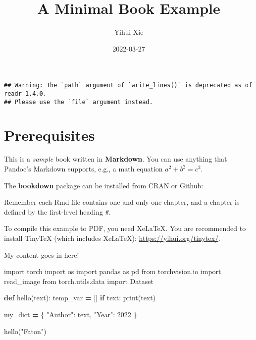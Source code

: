 \documentclass[
]{book}
\title{A Minimal Book Example}
\author{Yihui Xie}
\date{2022-03-27}
\newenvironment{Shaded}{\begin{snugshade}}{\end{snugshade}}
\newcommand{\BuiltInTok}[1]{#1}
\newcommand{\ControlFlowTok}[1]{\textcolor[rgb]{0.13,0.29,0.53}{\textbf{#1}}}
\newcommand{\DecValTok}[1]{\textcolor[rgb]{0.00,0.00,0.81}{#1}}
\newcommand{\ImportTok}[1]{#1}
\newcommand{\KeywordTok}[1]{\textcolor[rgb]{0.13,0.29,0.53}{\textbf{#1}}}
\newcommand{\NormalTok}[1]{#1}
\newcommand{\OperatorTok}[1]{\textcolor[rgb]{0.81,0.36,0.00}{\textbf{#1}}}
\newcommand{\StringTok}[1]{\textcolor[rgb]{0.31,0.60,0.02}{#1}}
\begin{document}
\maketitle

{
\setcounter{tocdepth}{1}
\tableofcontents
}
\begin{verbatim}
## Warning: The `path` argument of `write_lines()` is deprecated as of readr 1.4.0.
## Please use the `file` argument instead.
\end{verbatim}

\hypertarget{prerequisites}{%
\chapter*{Prerequisites}\label{prerequisites}}

This is a \emph{sample} book written in \textbf{Markdown}. You can use anything that Pandoc's Markdown supports, e.g., a math equation \(a^2 + b^2 = c^2\).

The \textbf{bookdown} package can be installed from CRAN or Github:

Remember each Rmd file contains one and only one chapter, and a chapter is defined by the first-level heading \texttt{\#}.

To compile this example to PDF, you need XeLaTeX. You are recommended to install TinyTeX (which includes XeLaTeX): \url{https://yihui.org/tinytex/}.

My content goes in here!

\begin{Shaded}
\begin{Highlighting}[]
\ImportTok{import}\NormalTok{ torch}
\ImportTok{import}\NormalTok{ os}
\ImportTok{import}\NormalTok{ pandas }\ImportTok{as}\NormalTok{ pd}
\ImportTok{from}\NormalTok{ torchvision.io }\ImportTok{import}\NormalTok{ read\_image}
\ImportTok{from}\NormalTok{ torch.utils.data }\ImportTok{import}\NormalTok{ Dataset}


\KeywordTok{def}\NormalTok{ hello(text):}
\NormalTok{  temp\_var }\OperatorTok{=}\NormalTok{ []}
  \ControlFlowTok{if}\NormalTok{ text:}
    \BuiltInTok{print}\NormalTok{(text)}
    
\NormalTok{  my\_dict }\OperatorTok{=}\NormalTok{ \{}
    \StringTok{"Author"}\NormalTok{: text,}
    \StringTok{"Year"}\NormalTok{: }\DecValTok{2022}
\NormalTok{  \}}
  
\NormalTok{hello(}\StringTok{"Faton"}\NormalTok{)}
\end{Highlighting}
\end{Shaded}
\end{document}
